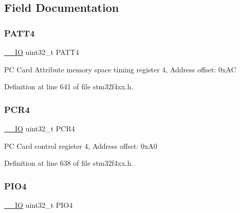 \subsection{Field Documentation}
\mbox{\label{struct_f_s_m_c___bank4___type_def_a955cad1aab7fb2d5b6e216cb29b5e7e2}} 
\subsubsection{\texorpdfstring{P\+A\+T\+T4}{PATT4}}
{\footnotesize\ttfamily \hyperlink{group___c_m_s_i_s__core__definitions_gaec43007d9998a0a0e01faede4133d6be}{\+\_\+\+\_\+\+IO} uint32\+\_\+t P\+A\+T\+T4}

PC Card Attribute memory space timing register 4, Address offset\+: 0x\+AC 

Definition at line 641 of file stm32f4xx.\+h.

\mbox{\label{struct_f_s_m_c___bank4___type_def_a2f02e7acfbd7e549ede84633215eb6a1}} 
\subsubsection{\texorpdfstring{P\+C\+R4}{PCR4}}
{\footnotesize\ttfamily \hyperlink{group___c_m_s_i_s__core__definitions_gaec43007d9998a0a0e01faede4133d6be}{\+\_\+\+\_\+\+IO} uint32\+\_\+t P\+C\+R4}

PC Card control register 4, Address offset\+: 0x\+A0 

Definition at line 638 of file stm32f4xx.\+h.

\mbox{\label{struct_f_s_m_c___bank4___type_def_ac53cd7a08093a4ae8f4de4bcff67a64f}} 
\subsubsection{\texorpdfstring{P\+I\+O4}{PIO4}}
{\footnotesize\ttfamily \hyperlink{group___c_m_s_i_s__core__definitions_gaec43007d9998a0a0e01faede4133d6be}{\+\_\+\+\_\+\+IO} uint32\+\_\+t P\+I\+O4}

